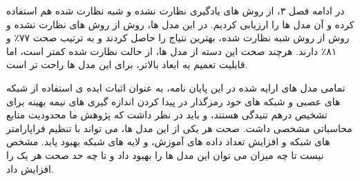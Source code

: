 در ادامه فصل ۳، از روش های یادگیری نظارت نشده و شبه نظارت شده هم استفاده کرده و آن مدل ها را ارزیابی کردیم. در این مدل ها، روش
از روش های نظارت نشده و روش
از روش شبه نظارت شده، بهترین نتیاج را حاصل کردند و به ترتیب صحت
۷۷٪
و
۸۱٪
دارند.
هرچند صحت این دسته از مدل ها، از حالت نظارت شده کمتر است، اما قابلیت تعمیم به ابعاد بالاتر، برای این مدل ها راحت تر است.

تمامی مدل های ارایه شده در این پایان نامه، به عنوان اثبات ایده ی استفاده از شبکه های عصبی و شبکه های خود رمزگذار در پیدا کردن اندازه گیری های نیمه بهینه برای تشخیص درهم تنیدگی هستند، و باید در نظر داشت که پژوهش ما محدودیت منابع محاسباتی مشخصی داشت. صحت هر یکی از این مدل ها، می تواند با تنظیم فراپارامتر های
شبکه و افزایش تعداد داده های آموزش، و لایه های شبکه بهبود یابد. مشخص نیست تا چه میزان می توان این مدل ها را بهبود داد و تا چه حد صحت هر یک را افزایش داد.

